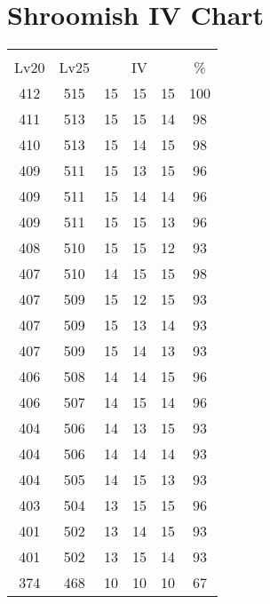 \documentclass{article}%
\begin{document}
%
\normalsize%
\section{Shroomish IV Chart}%
\label{sec:Shroomish IV Chart}%
\renewcommand{\arraystretch}{1.5}%
\begin{tabular}{|c|c|c|c|c|c|}%
\hline%
\multicolumn{6}{|c|}{\textcolor{white}{ 
\linebreak{Shroomish}
}%
\cellcolor{black}}\\%
\multicolumn{1}{|c}{Lv20}&\multicolumn{1}{c|}{Lv25}&\multicolumn{3}{c|}{IV}&\multicolumn{1}{|c|}{\%}\\%
\hline%
\rowcolor{color100}%
412&515&15&15&15&100\\%
\hline%
\rowcolor{color98}%
411&513&15&15&14&98\\%
\hline%
\rowcolor{color98}%
410&513&15&14&15&98\\%
\hline%
\rowcolor{color96}%
409&511&15&13&15&96\\%
\hline%
\rowcolor{color96}%
409&511&15&14&14&96\\%
\hline%
\rowcolor{color96}%
409&511&15&15&13&96\\%
\hline%
\rowcolor{color93}%
408&510&15&15&12&93\\%
\hline%
\rowcolor{color98}%
407&510&14&15&15&98\\%
\hline%
\rowcolor{color93}%
407&509&15&12&15&93\\%
\hline%
\rowcolor{color93}%
407&509&15&13&14&93\\%
\hline%
\rowcolor{color93}%
407&509&15&14&13&93\\%
\hline%
\rowcolor{color96}%
406&508&14&14&15&96\\%
\hline%
\rowcolor{color96}%
406&507&14&15&14&96\\%
\hline%
\rowcolor{color93}%
404&506&14&13&15&93\\%
\hline%
\rowcolor{color93}%
404&506&14&14&14&93\\%
\hline%
\rowcolor{color93}%
404&505&14&15&13&93\\%
\hline%
\rowcolor{color96}%
403&504&13&15&15&96\\%
\hline%
\rowcolor{color93}%
401&502&13&14&15&93\\%
\hline%
\rowcolor{color93}%
401&502&13&15&14&93\\%
\hline%
\rowcolor{color91}%
374&468&10&10&10&67\\%
\end{tabular}

%
\end{document}
